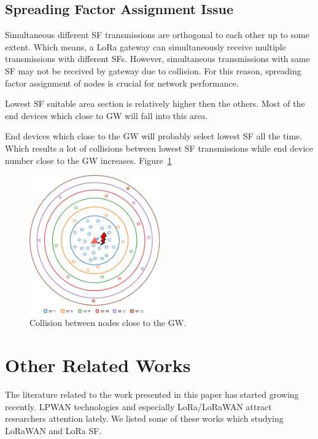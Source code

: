 \documentclass[conference]{IEEEtran}
\begin{document}
\subsection{Spreading Factor Assignment Issue}
\par Simultaneous different SF transmissions are orthogonal to each other up to some extent. Which means, a LoRa gateway can simultaneously receive multiple transmissions with different SFs. However, simultaneous transmissions with same SF may not be received by gateway due to collision. For this reason, spreading factor assignment of nodes is crucial for network performance.

\par [TODO] Lowest SF suitable area section is relatively higher then the others. Most of the end devices which close to GW will fall into this area.

\par [TODO] End devices which close to the GW will probably select lowest SF all the time. Which results a lot of collisions between lowest SF transmissions while end device number close to the GW increases. Figure~\ref{fig:collision}

\begin{figure}
\centering
\includegraphics[width=0.5\textwidth]{collision}
\caption{Collision between nodes close to the GW.}
\label{fig:collision}
\end{figure}


\section{Other Related Works} \label{Other Related Works}
The literature related to the work presented in this paper has started growing recently. LPWAN technologies and especially LoRa/LoRaWAN attract researchers attention lately. We listed some of these works which studying LoRaWAN and LoRa SF.
\end{document}
